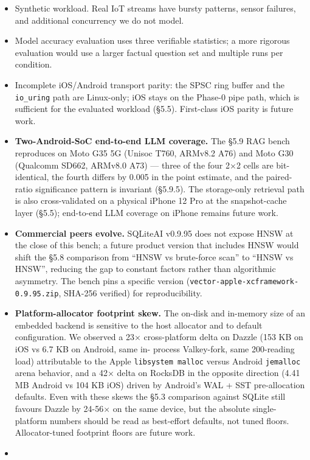 \begin{itemize}
\item
  Synthetic workload. Real IoT streams have bursty patterns, sensor failures,
  and additional concurrency we do not model.
\item
  Model accuracy evaluation uses three verifiable statistics; a more rigorous
  evaluation would use a larger factual question set and multiple runs per
  condition.
\item
  Incomplete iOS/Android transport parity: the SPSC ring buffer and the
  \texttt{io\_uring} path are Linux-only; iOS stays on the Phase-0 pipe path,
  which is sufficient for the evaluated workload (§5.5). First-class iOS parity
  is future work.
\item
  \textbf{Two-Android-SoC end-to-end LLM coverage.} The §5.9 RAG bench
  reproduces on Moto G35 5G (Unisoc T760, ARMv8.2 A76) and Moto G30 (Qualcomm
  SD662, ARMv8.0 A73) --- three of the four 2×2 cells are bit-identical, the
  fourth differs by 0.005 in the point estimate, and the paired-ratio
  significance pattern is invariant (§5.9.5). The storage-only retrieval path is
  also cross-validated on a physical iPhone 12 Pro at the snapshot-cache layer
  (§5.5); end-to-end LLM coverage on iPhone remains future work.
\item
  \textbf{Commercial peers evolve.} SQLiteAI v0.9.95 does not expose HNSW at the
  close of this bench; a future product version that includes HNSW would shift
  the §5.8 comparison from ``HNSW vs brute-force scan'' to ``HNSW vs HNSW'',
  reducing the gap to constant factors rather than algorithmic asymmetry. The
  bench pins a specific version (\texttt{vector-apple-xcframework-0.9.95.zip},
  SHA-256 verified) for reproducibility.
\item
  \textbf{Platform-allocator footprint skew.} The on-disk and in-memory size of
  an embedded backend is sensitive to the host allocator and to default
  configuration. We observed a 23× cross-platform delta on Dazzle (153 KB on iOS
  vs 6.7 KB on Android, same in- process Valkey-fork, same 200-reading load)
  attributable to the Apple \texttt{libsystem\ malloc} versus Android
  \texttt{jemalloc} arena behavior, and a 42× delta on RocksDB in the opposite
  direction (4.41 MB Android vs 104 KB iOS) driven by Android's WAL + SST
  pre-allocation defaults. Even with these skews the §5.3 comparison against
  SQLite still favours Dazzle by 24-56× on the same device, but the absolute
  single-platform numbers should be read as best-effort defaults, not tuned
  floors. Allocator-tuned footprint floors are future work.
\item

\end{itemize}

